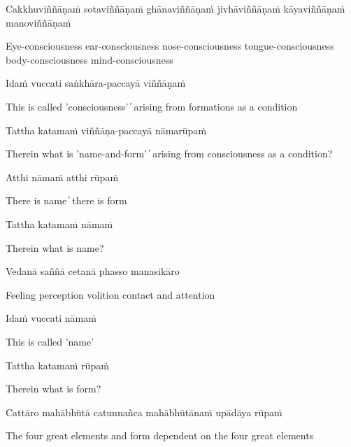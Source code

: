 Cakkhuviññāṇaṁ sotaviññāṇaṁ ghānaviññāṇaṁ jivhāviññāṇaṁ kāyaviññāṇaṁ manoviññāṇaṁ

\begin{cprenglish}
Eye-consciousness ear-consciousness nose-consciousness tongue-consciousness body-consciousness mind-consciousness
\end{cprenglish}

Idaṁ vuccati saṅkhāra-paccayā viññāṇaṁ

\begin{cprenglish}
This is called 'consciousness'  ̓  arising from formations as a condition
\end{cprenglish}

Tattha katamaṁ viññāṇa-paccayā nāmarūpaṁ

\begin{cprenglish}
Therein what is 'name-and-form'  ̓  arising from consciousness as a condition?
\end{cprenglish}

Atthi nāmaṁ atthi rūpaṁ

\begin{cprenglish}
There is name  ̓  there is form
\end{cprenglish}

Tattha katamaṁ nāmaṁ

\begin{cprenglish}
Therein what is name?
\end{cprenglish}

Vedanā saññā cetanā phasso manasikāro

\begin{cprenglish}
Feeling perception volition contact and attention
\end{cprenglish}

Idaṁ vuccati nāmaṁ

\begin{cprenglish}
This is called 'name'
\end{cprenglish}

Tattha katamaṁ rūpaṁ

\begin{cprenglish}
Therein what is form?
\end{cprenglish}

Cattāro mahābhūtā catunnañca mahābhūtānaṁ upādāya rūpaṁ

\begin{cprenglish}
The four great elements and form dependent on the four great elements
\end{cprenglish}

